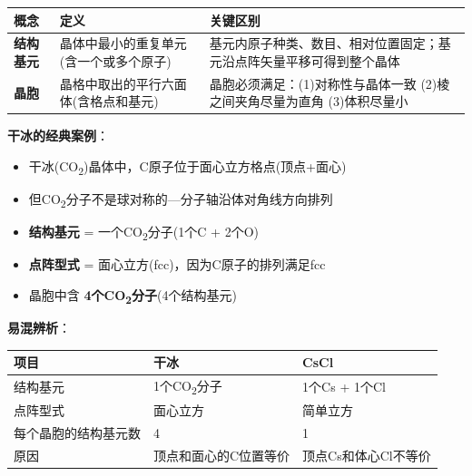 \documentclass[a4paper,11pt]{ctexart}
\providecommand{\tightlist}{\setlength{\itemsep}{0pt}\setlength{\parskip}{0pt}}
\newcounter{none}
\newcommand{\箭}{\ensuremath{\rightarrow}}
\newcommand{\左箭}{\ensuremath{\leftarrow}}
\newcommand{\上箭}{\ensuremath{\uparrow}}
\newcommand{\下箭}{\ensuremath{\downarrow}}
\newcommand{\衡}{\ensuremath{\rightleftharpoons}}
\newcommand{\双箭}{\ensuremath{\leftrightarrow}}
\newcommand{\约等于}{\ensuremath{\approx}}
\newcommand{\小于等于}{\ensuremath{\leq}}
\newcommand{\大于等于}{\ensuremath{\geq}}
\newcommand{\不等于}{\ensuremath{\neq}}
\newcommand{\西格马}{\ensuremath{\sigma}}
\newcommand{\派}{\ensuremath{\pi}}
\begin{document}
{\def\LTcaptype{none} %
\begin{longtable}[]{@{}
  >{\raggedright\arraybackslash}p{}
  >{\raggedright\arraybackslash}p{}
  >{\raggedright\arraybackslash}p{}@{}}
\toprule\noalign{}
\begin{minipage}[b]{\linewidth}\raggedright
概念
\end{minipage} & \begin{minipage}[b]{\linewidth}\raggedright
定义
\end{minipage} & \begin{minipage}[b]{\linewidth}\raggedright
关键区别
\end{minipage} \\
\midrule\noalign{}
\endhead
\bottomrule\noalign{}
\endlastfoot
\textbf{结构基元} & 晶体中最小的重复单元(含一个或多个原子) & 基元内原子种类、数目、相对位置固定；基元沿点阵矢量平移可得到整个晶体 \\
\textbf{晶胞} & 晶格中取出的平行六面体(含格点和基元) & 晶胞必须满足：(1)对称性与晶体一致 (2)棱之间夹角尽量为直角 (3)体积尽量小 \\
\end{longtable}
}

\textbf{干冰的经典案例}：

\begin{itemize}
\tightlist
\item
  干冰(CO\textsubscript{2})晶体中，C原子位于面心立方格点(顶点+面心)
\item
  但CO\textsubscript{2}分子不是球对称的---分子轴沿体对角线方向排列
\item
  \textbf{结构基元} = 一个CO\textsubscript{2}分子(1个C + 2个O)
\item
  \textbf{点阵型式} = 面心立方(fcc)，因为C原子的排列满足fcc
\item
  晶胞中含 \textbf{4个CO\textsubscript{2}分子}(4个结构基元)
\end{itemize}

\textbf{易混辨析}：

{\def\LTcaptype{none} %
\begin{longtable}[]{@{}lll@{}}
\toprule\noalign{}
项目 & 干冰 & CsCl \\
\midrule\noalign{}
\endhead
\bottomrule\noalign{}
\endlastfoot
结构基元 & 1个CO\textsubscript{2}分子 & 1个Cs + 1个Cl \\
点阵型式 & 面心立方 & 简单立方 \\
每个晶胞的结构基元数 & 4 & 1 \\
原因 & 顶点和面心的C位置等价 & 顶点Cs和体心Cl不等价 \\
\end{longtable}
}
\end{document}
